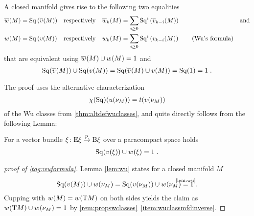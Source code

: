 \begin{Thm}[Wu]\label{thm:wu}
  A closed manifold gives rise to the following two equalities
  \begin{align}\notag
    {\overline{w}_{}}(M) &= \mathrm{Sq}\left({\overline{v}_{}}(M)\right)
    &\text{respectively}&
    &{\overline{w}_{k}}(M) &= \sum_{i\geq0} \mathrm{Sq}^{i}\left({\overline{v}_{k-i}}(M)\right)
    &\text{and}
    \\
    {w_{}}(M) &= \mathrm{Sq}\left({v_{}}(M)\right)
    &\text{respectively}&
    &{w_{k}}(M) &= \sum_{i\geq0} \mathrm{Sq}^{i}\left({v_{k-i}}(M)\right)
    \label{tag:wuformula}\tag{Wu's formula}
  \end{align}
  that are equivalent using
  ${\overline{w}_{}}(M)\cup{w_{}}(M) = 1$ and
  \begin{gather*}
    \mathrm{Sq}({\overline{v}_{}}(M))\cup\mathrm{Sq}({v_{}}(M))
    = \mathrm{Sq}({\overline{v}_{}}(M)\cup{v_{}}(M))
    = \mathrm{Sq}(1)
    = 1
    \;.
  \end{gather*}
\end{Thm}
The proof uses the alternative characterization
\begin{gather*}
  \chi(\mathrm{Sq})({u}(\nu_{M})) = t({v_{}}(\nu_{M}))
\end{gather*}
of the Wu classes from \autoref{thm:altdefwuclasses}, and quite directly
follows from the following Lemma:
\begin{Lem}\label{lem:wu}
  For a vector bundle $\xi\colon \mathrm{E}\xi\xrightarrow{p}\mathrm{B}\xi$ over a
  paracompact space holds
  \begin{gather*}
    \mathrm{Sq}({v_{}}(\xi)) \cup {w_{}}(\xi)= 1
    \;.
  \end{gather*}
\end{Lem}
\begin{proof}[proof of \ref{tag:wuformula}]
  Lemma \autoref{lem:wu} states for a closed manifold $M$
  \begin{gather*}
    \SQ(\V{M}) \cup \W{\N M}
    = \SQ(\V{\N M}) \cup \W{\N M}
    \cequalsby{\autoref{lem:wu}} 1
    \;.
  \end{gather*}
  Cupping with ${w_{}}(M)={w_{}}(\mathrm{T}M)$ on both sides yields the claim
  as ${w_{}}(\mathrm{T}M) \cup {w_{}}(\nu_{M}) = 1$ by
  \autoref{rem:propswclasses}~\ref{item:wuclassmfdinverse}.
\end{proof}
